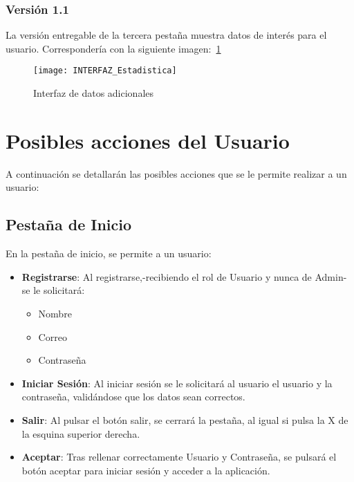 \subsubsection{Versión 1.1}
La versión entregable de la tercera pestaña muestra datos de interés para el usuario. Correspondería con la siguiente imagen:~\ref{fig:C.3.4.1}
\begin{figure}[h]
\centering
\texttt{[image: INTERFAZ\_Estadistica]}
\caption{Interfaz de datos adicionales}
\label{fig:C.3.4.1}
\end{figure} 

\section{Posibles acciones del Usuario}
A continuación se detallarán las posibles acciones que se le permite realizar a un usuario: 
\subsection{Pestaña de Inicio}
En la pestaña de inicio, se permite a un usuario: 
\begin{itemize}
\item \textbf{Registrarse}: Al registrarse,-recibiendo el rol de Usuario y nunca de Admin- se le solicitará: 
\begin{itemize}
\item Nombre
\item Correo
\item Contraseña
\end{itemize}	

\item \textbf{Iniciar Sesión}: Al iniciar sesión se le solicitará  al usuario el usuario y la contraseña, validándose que los datos sean correctos.
\item \textbf{Salir}: Al pulsar el botón salir, se cerrará la pestaña, al igual si pulsa la X de la esquina superior derecha. 
\item \textbf{Aceptar}: Tras rellenar correctamente Usuario y Contraseña, se pulsará el botón aceptar para iniciar sesión y acceder a la aplicación. 
\end{itemize}


